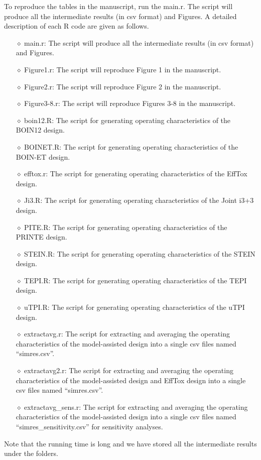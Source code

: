 \documentclass[notitlepage]{article}
\begin{document}
To reproduce the tables in the manuscript, run the main.r.
The script will produce all the intermediate results (in csv format) and Figures.
A detailed description of each R code are given as follows.
\begin{itemize}
\item[$\diamond$] main.r: The script will produce all the intermediate results (in csv format) and Figures.
\item[$\diamond$] Figure1.r: The script will reproduce Figure 1 in the manuscript.
\item[$\diamond$] Figure2.r: The script will reproduce Figure 2 in the manuscript.
\item[$\diamond$] Figure3-8.r: The script will reproduce Figures 3-8 in the manuscript.
\item[$\diamond$] boin12.R: The script for generating operating characteristics of the BOIN12 design.
\item[$\diamond$] BOINET.R: The script for generating operating characteristics of the BOIN-ET design.
\item[$\diamond$] efftox.r: The script for generating operating characteristics of the EffTox design.
\item[$\diamond$] Ji3.R: The script for generating operating characteristics of the Joint i3+3 design.
\item[$\diamond$] PITE.R: The script for generating operating characteristics of the PRINTE design.
\item[$\diamond$] STEIN.R: The script for generating operating characteristics of the STEIN design.
\item[$\diamond$] TEPI.R: The script for generating operating characteristics of the TEPI design.
\item[$\diamond$] uTPI.R: The script for generating operating characteristics of the uTPI design.
\item[$\diamond$] extractavg.r: The script for extracting and averaging the operating characteristics of the model-assisted design into a single csv files named ``simres.csv''.
\item[$\diamond$] extractavg2.r: The script for extracting and averaging the operating characteristics of the model-assisted design  and EffTox design into a single csv files named ``simres.csv''.
\item[$\diamond$] extractavg\_sens.r: The script for extracting and averaging the operating characteristics of the model-assisted design into a single csv files named ``simres\_sensitivity.csv'' for sensitivity analyses.
\end{itemize}
Note that the running time is long and we have stored all the intermediate results under the folders.
\end{document}
